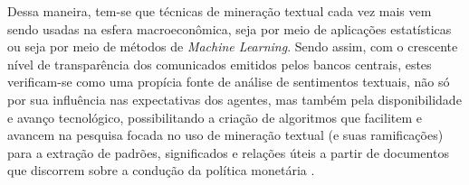Dessa maneira, tem-se que técnicas de mineração textual cada vez mais vem sendo usadas na esfera macroeconômica, seja por meio de aplicações estatísticas ou seja por meio de métodos de \textit{Machine Learning}. Sendo assim, com o crescente nível de transparência dos comunicados emitidos pelos bancos centrais, estes verificam-se como uma propícia fonte de análise de sentimentos textuais, não só por sua influência nas expectativas dos agentes, mas também pela disponibilidade e avanço tecnológico, possibilitando a criação de algoritmos que facilitem e avancem na pesquisa focada no uso de mineração textual (e suas ramificações) para a extração de padrões, significados e relações úteis a partir de documentos que discorrem sobre a condução da política monetária \cite{Shapiro2019}.